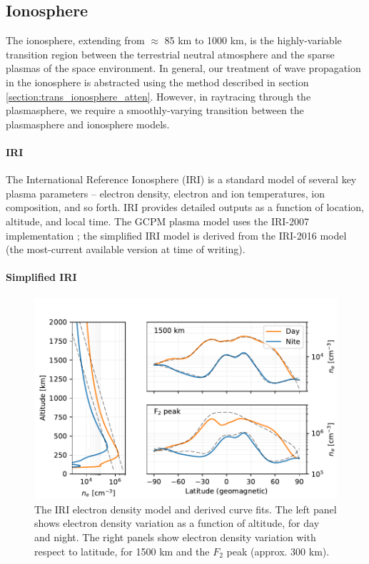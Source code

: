 \subsection{Ionosphere}
The ionosphere, extending from $\approx$ 85 km to 1000 km, is the highly-variable transition region between the terrestrial neutral atmosphere and the sparse plasmas of the space environment. In general, our treatment of wave propagation in the ionosphere is abstracted using the method described in section \ref{section:trans_ionosphere_atten}. However, in raytracing through the plasmasphere, we require a smoothly-varying transition between the plasmasphere and ionosphere models.

\paragraph{IRI}
The International Reference Ionosphere (IRI) is a standard model of several key plasma parameters -- electron density, electron and ion temperatures, ion composition, and so forth. IRI provides detailed outputs as a function of location, altitude, and local time. The GCPM plasma model uses the IRI-2007 implementation \citep{Bilitza2008}; the simplified IRI model is derived from the IRI-2016 model (the most-current available version at time of writing).

\paragraph{Simplified IRI}
\begin{figure}[h]
\begin{center}
\includegraphics{figures/iono_profile.pdf}
\caption[Ionosphere density profile]{The IRI electron density model and derived curve fits. The left panel shows electron density variation as a function of altitude, for day and night. The right panels show electron density variation with respect to latitude, for 1500 km and the $F_2$ peak (approx. 300 km).}
\label{fig:iono_profile}
\end{center}
\end{figure}

